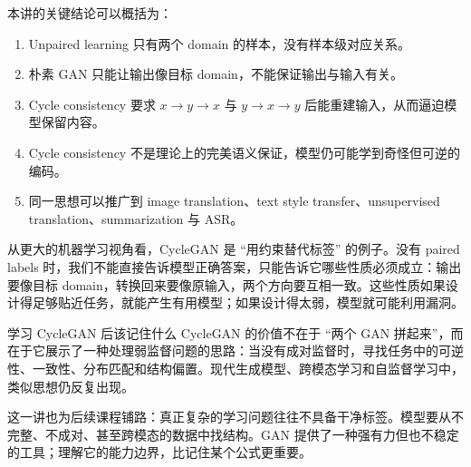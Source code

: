 \documentclass[a4paper]{article}
\begin{document}
本讲的关键结论可以概括为：

\begin{enumerate}
    \item Unpaired learning 只有两个 domain 的样本，没有样本级对应关系。
    \item 朴素 GAN 只能让输出像目标 domain，不能保证输出与输入有关。
    \item Cycle consistency 要求 $x\to y\to x$ 与 $y\to x\to y$ 后能重建输入，从而逼迫模型保留内容。
    \item Cycle consistency 不是理论上的完美语义保证，模型仍可能学到奇怪但可逆的编码。
    \item 同一思想可以推广到 image translation、text style transfer、unsupervised translation、summarization 与 ASR。
\end{enumerate}

从更大的机器学习视角看，CycleGAN 是 ``用约束替代标签'' 的例子。没有 paired labels 时，我们不能直接告诉模型正确答案，只能告诉它哪些性质必须成立：输出要像目标 domain，转换回来要像原输入，两个方向要互相一致。这些性质如果设计得足够贴近任务，就能产生有用模型；如果设计得太弱，模型就可能利用漏洞。

\begin{importantbox}{学习 CycleGAN 后该记住什么}
    CycleGAN 的价值不在于 ``两个 GAN 拼起来''，而在于它展示了一种处理弱监督问题的思路：当没有成对监督时，寻找任务中的可逆性、一致性、分布匹配和结构偏置。现代生成模型、跨模态学习和自监督学习中，类似思想仍反复出现。
\end{importantbox}

这一讲也为后续课程铺路：真正复杂的学习问题往往不具备干净标签。模型要从不完整、不成对、甚至跨模态的数据中找结构。GAN 提供了一种强有力但也不稳定的工具；理解它的能力边界，比记住某个公式更重要。
\end{document}
